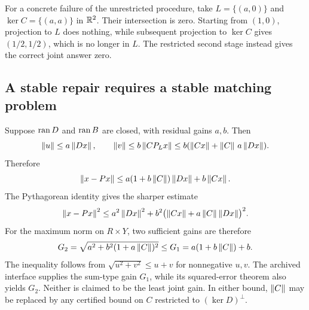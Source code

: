 For a concrete failure of the unrestricted procedure, take \(L=\{(a,0)\}\) and \(\ker C=\{(a,a)\}\) in \(\mathbb R^2\). Their intersection is zero. Starting from \((1,0)\), projection to \(L\) does nothing, while subsequent projection to \(\ker C\) gives \((1/2,1/2)\), which is no longer in \(L\). The restricted second stage instead gives the correct joint answer zero.


\subsection{A stable repair requires a stable matching problem}
Suppose \(\operatorname{ran} D\) and \(\operatorname{ran} B\) are closed, with residual gains \(a,b\). Then
\[
 \left\lVert u\right\rVert\le a\left\lVert Dx\right\rVert,\qquad
 \left\lVert v\right\rVert\le b\left\lVert CP_Lx\right\rVert
 \le b(\left\lVert Cx\right\rVert+\left\lVert C\right\rVert\,a\left\lVert Dx\right\rVert).
\]
Therefore
\begin{equation}\label{eq:jointgain}
 \left\lVert x-Px\right\rVert\le
 a(1+b\left\lVert C\right\rVert)\left\lVert Dx\right\rVert+b\left\lVert Cx\right\rVert.
\end{equation}
The Pythagorean identity gives the sharper estimate
\[
 \left\lVert x-Px\right\rVert^2\le
 a^2\left\lVert Dx\right\rVert^2+b^2\bigl(\left\lVert Cx\right\rVert+a\left\lVert C\right\rVert\left\lVert Dx\right\rVert\bigr)^2.
\]
For the maximum norm on \(R\times Y\), two sufficient gains are therefore
\[
 G_2=\sqrt{a^2+b^2(1+a\left\lVert C\right\rVert)^2}
 \le G_1=a(1+b\left\lVert C\right\rVert)+b.
\]
The inequality follows from \(\sqrt{u^2+v^2}\le u+v\) for nonnegative \(u,v\). The archived interface supplies the sum-type gain \(G_1\), while its squared-error theorem also yields \(G_2\). Neither is claimed to be the least joint gain. In either bound, \(\left\lVert C\right\rVert\) may be replaced by any certified bound on \(C\) restricted to \((\ker D)^\perp\).

